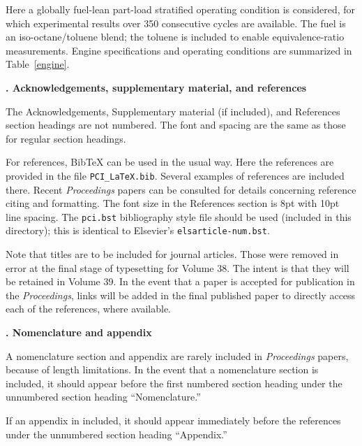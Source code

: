 \documentclass[twocolumn,10pt]{article} %
\renewcommand{\section}%
              [1]%
              {%
               \bgroup%
               \flushleft%
               \small\bf%
               \stepcounter{section}%
               \arabic{section}. #1%
               \par%
               \egroup%
              }%
\begin{document}
Here a globally fuel-lean part-load stratified operating condition is considered, for which experimental results over 350 consecutive cycles are available. The fuel is an iso-octane/toluene blend; the toluene is included to enable equivalence-ratio measurements. Engine specifications and operating conditions are summarized in Table~\ref{engine}. 

\section{Acknowledgements, supplementary material, and references} \addvspace{10pt}

The Acknowledgements, Supplementary material (if included), and References section headings are not numbered. The font and spacing are the same as those for regular section headings.

For references, BibTeX can be used in the usual way. Here the references are provided in the file \verb+PCI_LaTeX.bib+. Several examples of references are included there. Recent {\em Proceedings} papers can be consulted for details concerning reference citing and formatting. The font size in the References section is 8pt with 10pt line spacing. The \verb+pci.bst+ bibliography style file should be used (included in this directory); this is identical to Elsevier's \verb+elsarticle-num.bst+. 

Note that titles are to be included for journal articles. Those were removed in error at the final stage of typesetting for Volume 38. The intent is that they will be retained in Volume 39. In the event that a paper is accepted for publication in the {\em Proceedings}, links will be added in the final published paper to directly access each of the references, where available.

\section{Nomenclature and appendix} \addvspace{10pt}

A nomenclature section and appendix are rarely included in {\em Proceedings} papers, because of length limitations. In the event that a nomenclature section is included, it should appear before the first numbered section heading under the unnumbered section heading “Nomenclature.” 
 
If an appendix in included, it should appear immediately before the references under the unnumbered section heading ``Appendix.''
\end{document}
